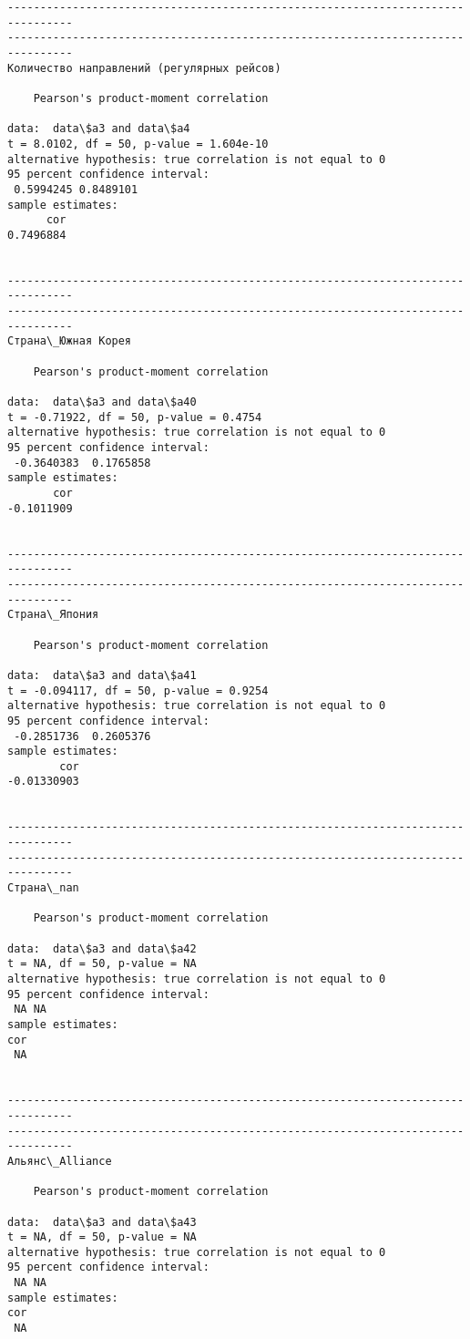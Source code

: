 \documentclass[11pt,mathletters]{article}
\begin{document}
\begin{Verbatim}[commandchars=\\\{\}]
--------------------------------------------------------------------------------
--------------------------------------------------------------------------------
Количество направлений (регулярных рейсов)

	Pearson's product-moment correlation

data:  data\$a3 and data\$a4
t = 8.0102, df = 50, p-value = 1.604e-10
alternative hypothesis: true correlation is not equal to 0
95 percent confidence interval:
 0.5994245 0.8489101
sample estimates:
      cor 
0.7496884 


--------------------------------------------------------------------------------
--------------------------------------------------------------------------------
Страна\_Южная Корея 

	Pearson's product-moment correlation

data:  data\$a3 and data\$a40
t = -0.71922, df = 50, p-value = 0.4754
alternative hypothesis: true correlation is not equal to 0
95 percent confidence interval:
 -0.3640383  0.1765858
sample estimates:
       cor 
-0.1011909 


--------------------------------------------------------------------------------
--------------------------------------------------------------------------------
Страна\_Япония

	Pearson's product-moment correlation

data:  data\$a3 and data\$a41
t = -0.094117, df = 50, p-value = 0.9254
alternative hypothesis: true correlation is not equal to 0
95 percent confidence interval:
 -0.2851736  0.2605376
sample estimates:
        cor 
-0.01330903 


--------------------------------------------------------------------------------
--------------------------------------------------------------------------------
Страна\_nan

	Pearson's product-moment correlation

data:  data\$a3 and data\$a42
t = NA, df = 50, p-value = NA
alternative hypothesis: true correlation is not equal to 0
95 percent confidence interval:
 NA NA
sample estimates:
cor 
 NA 


--------------------------------------------------------------------------------
--------------------------------------------------------------------------------
Альянс\_Alliance

	Pearson's product-moment correlation

data:  data\$a3 and data\$a43
t = NA, df = 50, p-value = NA
alternative hypothesis: true correlation is not equal to 0
95 percent confidence interval:
 NA NA
sample estimates:
cor 
 NA 



\end{Verbatim}
\end{document}
